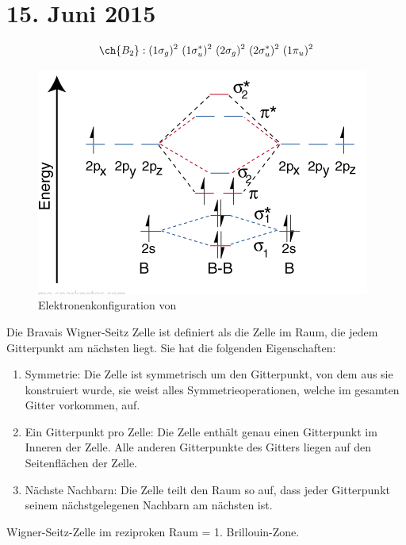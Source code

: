 \section{15. Juni 2015}

\label{q:31}

\[\ch{B_2} : (1\sigma_g)^2 ~ (1\sigma_u^*)^2 ~ (2\sigma_g)^2 ~ (2\sigma_u^*)^2 ~ (1\pi_u)^2\]

\begin{figure}[H]
    \centering
    \begin{samepage}
        \includegraphics[width=0.8\linewidth]{resources/15-06-2015/b2.PNG}
        \caption{Elektronenkonfiguration von }
    \end{samepage}
\end{figure}

\label{q:32}

\label{q:33}

Die Bravais Wigner-Seitz Zelle ist definiert als die Zelle im Raum, die jedem Gitterpunkt am nächsten 
liegt. Sie hat die folgenden Eigenschaften:
\begin{enumerate}
    \item Symmetrie: Die Zelle ist symmetrisch um den Gitterpunkt, von dem aus sie konstruiert wurde, sie weist alles Symmetrieoperationen, welche im gesamten Gitter vorkommen, auf. 
    \item Ein Gitterpunkt pro Zelle: Die Zelle enthält genau einen Gitterpunkt im Inneren der Zelle. Alle anderen Gitterpunkte des Gitters liegen auf den Seitenflächen der Zelle.
    \item Nächste Nachbarn: Die Zelle teilt den Raum so auf, dass jeder Gitterpunkt seinem nächstgelegenen Nachbarn am nächsten ist. %
\end{enumerate}
Wigner-Seitz-Zelle im reziproken Raum = 1. Brillouin-Zone.

